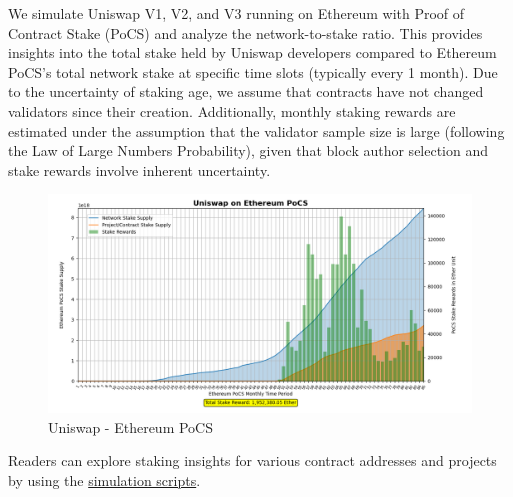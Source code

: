 \documentclass{article}
\begin{document}
We simulate Uniswap V1, V2, and V3 running on Ethereum with Proof of Contract Stake (PoCS) and analyze the network-to-stake ratio. This provides insights into the total stake held by Uniswap developers compared to Ethereum PoCS's total network stake at specific time slots (typically every 1 month). Due to the uncertainty of staking age, we assume that contracts have not changed validators since their creation. Additionally, monthly staking rewards are estimated under the assumption that the validator sample size is large (following the Law of Large Numbers Probability), given that block author selection and stake rewards involve inherent uncertainty.

\begin{figure}[h]
    \centering
    \includegraphics[width=\textwidth]{./assets/uniswap-pocs.png}
    \caption{Uniswap - Ethereum PoCS}
\end{figure}

Readers can explore staking insights for various contract addresses and projects by using the \href{https://github.com/auguth/dot_org/tree/gh-pages/assets/pocs/simulation/pocs}{simulation scripts}.
\end{document}
